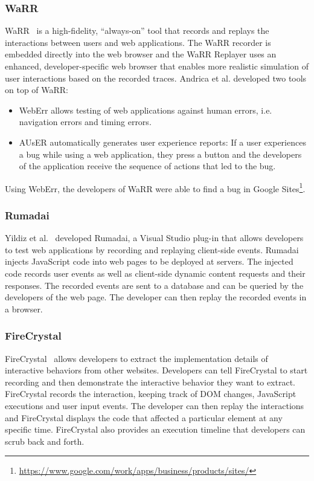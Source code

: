 \subsubsection{WaRR}

WaRR~\cite{warr2011} is a high-fidelity, ``always-on'' tool that records and replays the interactions between users and web applications. The WaRR recorder is embedded directly into the web browser and the WaRR Replayer uses an enhanced, developer-specific web browser that enables more realistic simulation of user interactions based on the recorded traces. Andrica et al. developed two tools on top of WaRR:
\begin{itemize}
	\item WebErr allows testing of web applications against human errors, i.e. navigation errors and timing errors.
	\item AUsER automatically generates user experience reports: If a user experiences a bug while using a web application, they press a button and the developers of the application receive the sequence of actions that led to the bug.
\end{itemize}
Using WebErr, the developers of WaRR were able to find a bug in Google Sites\footnote{\url{https://www.google.com/work/apps/business/products/sites/}}.

\subsubsection{Rumadai}

Yildiz et al.~\cite{rumadai2012} developed Rumadai, a Visual Studio plug-in that allows developers to test web applications by recording and replaying client-side events. Rumadai injects JavaScript code into web pages to be deployed at servers. The injected code records user events as well as client-side dynamic content requests and their responses. The recorded events are sent to a database and can be queried by the developers of the web page. The developer can then replay the recorded events in a browser.
\subsubsection{FireCrystal}

FireCrystal~\cite{firecrystal2009} allows developers to extract the implementation details of interactive behaviors from other websites. Developers can tell FireCrystal to start recording and then demonstrate the interactive behavior they want to extract. FireCrystal records the interaction, keeping track of DOM changes, JavaScript executions and user input events. The developer can then replay the interactions and FireCrystal displays the code that affected a particular element at any specific time. FireCrystal also provides an execution timeline that developers can scrub back and forth.


